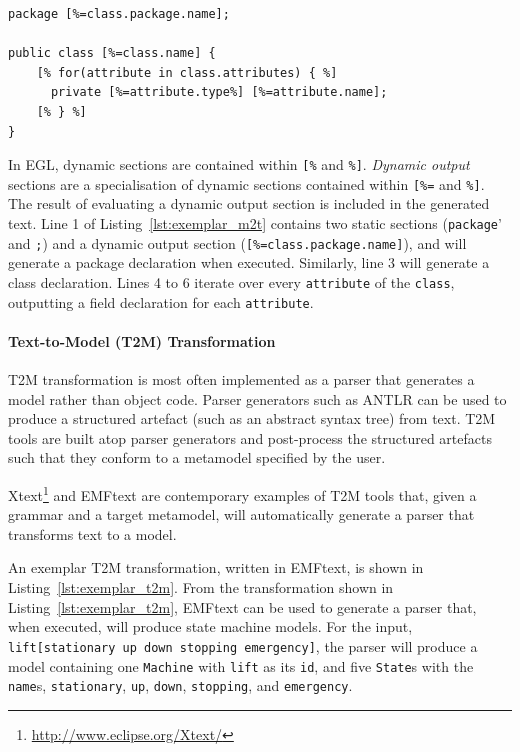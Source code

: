 \begin{lstlisting}[caption=Exemplar M2T transformation in the Epsilon Generation Language \cite{rose08egl}, label=lst:exemplar_m2t, language=EGL]
package [%=class.package.name];

public class [%=class.name] {
	[% for(attribute in class.attributes) { %]
	  private [%=attribute.type%] [%=attribute.name];
	[% } %]
}
\end{lstlisting}

In EGL, dynamic sections are contained within \texttt{[\%} and \texttt{\%]}. \emph{Dynamic output} sections are a specialisation of dynamic sections contained within \texttt{[\%=} and \texttt{\%]}. The result of evaluating a dynamic output section is included in the generated text. Line 1 of Listing~\ref{lst:exemplar_m2t} contains two static sections (\texttt{package}' and \texttt{;}) and a dynamic output section (\texttt{[\%=class.package.name]}), and will generate a package declaration when executed.  Similarly, line 3 will generate a class declaration. Lines 4 to 6 iterate over every \texttt{attribute} of the \texttt{class}, outputting a field declaration for each \texttt{attribute}.


\paragraph{Text-to-Model (T2M) Transformation} T2M transformation is most often implemented as a parser that generates a model rather than object code. Parser generators such as ANTLR \cite{parr07antlr} can be used to produce a structured artefact (such as an abstract syntax tree) from text. T2M tools are built atop parser generators and post-process the structured artefacts such that they conform to a metamodel specified by the user.

Xtext\footnote{\url{http://www.eclipse.org/Xtext/}} and EMFtext \cite{heidenreich09derivation} are contemporary examples of T2M tools that, given a grammar and a target metamodel, will automatically generate a parser that transforms text to a model.

An exemplar T2M transformation, written in EMFtext, is shown in Listing~\ref{lst:exemplar_t2m}. From the transformation shown in Listing~\ref{lst:exemplar_t2m}, EMFtext can be used to generate a parser that, when executed, will produce state machine models. For the input, \texttt{lift[stationary up down stopping emergency]}, the parser will produce a model containing one \texttt{Machine} with \texttt{lift} as its \texttt{id}, and five \texttt{State}s with the \texttt{name}s, \texttt{stationary}, \texttt{up}, \texttt{down}, \texttt{stopping}, and \texttt{emergency}.

